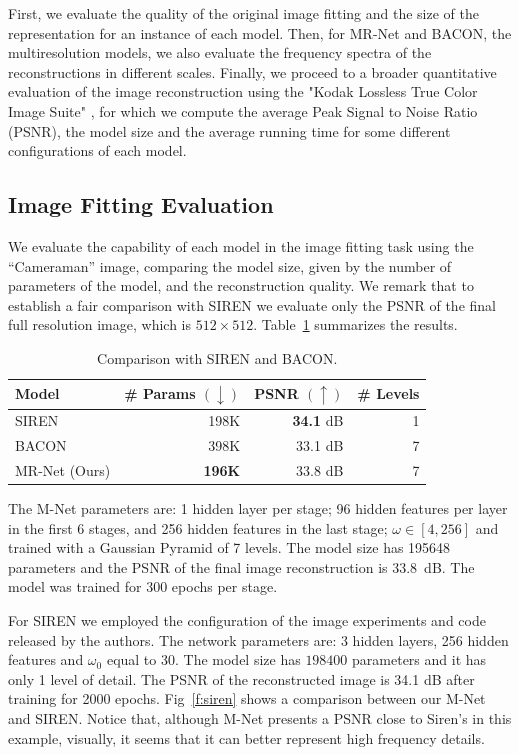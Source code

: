 First, we evaluate the quality of the original image fitting and the size of the representation for an instance of each model. Then, for MR-Net and BACON, the multiresolution models, we also evaluate the frequency spectra of the reconstructions in different scales. Finally, we proceed to a broader quantitative evaluation of the image reconstruction using the "Kodak Lossless True Color Image Suite" \cite{KodakDataset}, for which we compute the average Peak Signal to Noise Ratio (PSNR), the model size and the average running time for some different configurations of each model. 

\subsection{Image Fitting Evaluation}

We evaluate the capability of each model in the image fitting task using the ``Cameraman'' image, comparing the model size, given by the number of parameters of the model, and the reconstruction quality. We remark that to establish a fair comparison with SIREN we evaluate only the PSNR of the final full resolution image, which is $512\times 512$. Table~\ref{t:comp} summarizes the results.

\begin{table}[!h]
\centering
\small
\begin{tabular}{|l|r|r|r|}
\hline
Model & \# Params $(\downarrow)$ & PSNR $(\uparrow)$ & \# Levels \\
\hline
SIREN~\cite{sitzmann2019siren} & 198K & {\bf 34.1} dB & 1  \\
BACON~\cite{bacon2021} & 398K & 33.1 dB & 7 \\
MR-Net (Ours) & {\bf 196K} & 33.8 dB & 7  \\
\hline
\end{tabular}
\caption{\label{tab:comp} Comparison with SIREN and BACON.}
\label{t:comp}
\end{table}

The M-Net parameters are: 1 hidden layer per stage; 96 hidden features per layer in the first 6 stages, and 256 hidden features in the last stage; $\omega \in [4, 256]$ and trained with a Gaussian Pyramid of 7 levels. The model size has 195648 parameters and the PSNR of the final image reconstruction is 33.8~dB. The model was trained for 300 epochs per stage.

For SIREN we employed the configuration of the image experiments and code released by the authors. The network parameters are: 3 hidden layers, 256 hidden features and $\omega_0$ equal to 30. The model size has $198400$ parameters and it has only 1 level of detail. The PSNR of the reconstructed image is 34.1 dB after training for 2000 epochs. Fig~\ref{f:siren} shows a comparison between our M-Net and SIREN. Notice that, although M-Net presents a PSNR close to Siren's in this example, visually, it seems that it can better represent high frequency details.


